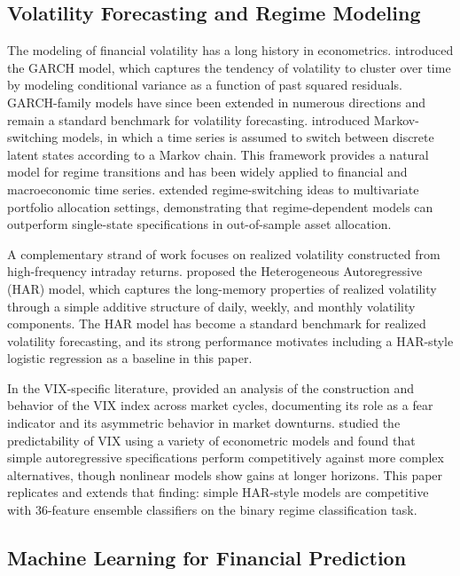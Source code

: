 \documentclass[12pt]{article}
\begin{document}
\subsection{Volatility Forecasting and Regime Modeling}

The modeling of financial volatility has a long history in econometrics. \citet{bollerslev1986} introduced the GARCH model, which captures the tendency of volatility to cluster over time by modeling conditional variance as a function of past squared residuals. GARCH-family models have since been extended in numerous directions and remain a standard benchmark for volatility forecasting. \citet{hamilton1989} introduced Markov-switching models, in which a time series is assumed to switch between discrete latent states according to a Markov chain. This framework provides a natural model for regime transitions and has been widely applied to financial and macroeconomic time series. \citet{guidolin2007} extended regime-switching ideas to multivariate portfolio allocation settings, demonstrating that regime-dependent models can outperform single-state specifications in out-of-sample asset allocation.

A complementary strand of work focuses on realized volatility constructed from high-frequency intraday returns. \citet{corsi2009} proposed the Heterogeneous Autoregressive (HAR) model, which captures the long-memory properties of realized volatility through a simple additive structure of daily, weekly, and monthly volatility components. The HAR model has become a standard benchmark for realized volatility forecasting, and its strong performance motivates including a HAR-style logistic regression as a baseline in this paper.

In the VIX-specific literature, \citet{whaley2009} provided an analysis of the construction and behavior of the VIX index across market cycles, documenting its role as a fear indicator and its asymmetric behavior in market downturns. \citet{fernandes2014} studied the predictability of VIX using a variety of econometric models and found that simple autoregressive specifications perform competitively against more complex alternatives, though nonlinear models show gains at longer horizons. This paper replicates and extends that finding: simple HAR-style models are competitive with 36-feature ensemble classifiers on the binary regime classification task.

\subsection{Machine Learning for Financial Prediction}
\end{document}
